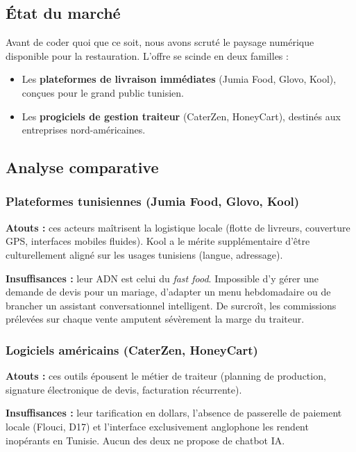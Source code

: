 \subsection{État du marché}

Avant de coder quoi que ce soit, nous avons scruté le paysage numérique disponible pour la restauration. L'offre se scinde en deux familles :
\begin{itemize}
    \item Les \textbf{plateformes de livraison immédiates} (Jumia Food, Glovo, Kool), conçues pour le grand public tunisien.
    \item Les \textbf{progiciels de gestion traiteur} (CaterZen, HoneyCart), destinés aux entreprises nord-américaines.
\end{itemize}

\subsection{Analyse comparative}

\subsubsection{Plateformes tunisiennes (Jumia Food, Glovo, Kool)}

\textbf{Atouts :} ces acteurs maîtrisent la logistique locale (flotte de livreurs, couverture GPS, interfaces mobiles fluides). Kool a le mérite supplémentaire d'être culturellement aligné sur les usages tunisiens (langue, adressage).

\textbf{Insuffisances :} leur ADN est celui du \textit{fast food}. Impossible d'y gérer une demande de devis pour un mariage, d'adapter un menu hebdomadaire ou de brancher un assistant conversationnel intelligent. De surcroît, les commissions prélevées sur chaque vente amputent sévèrement la marge du traiteur.

\subsubsection{Logiciels américains (CaterZen, HoneyCart)}

\textbf{Atouts :} ces outils épousent le métier de traiteur (planning de production, signature électronique de devis, facturation récurrente).

\textbf{Insuffisances :} leur tarification en dollars, l'absence de passerelle de paiement locale (Flouci, D17) et l'interface exclusivement anglophone les rendent inopérants en Tunisie. Aucun des deux ne propose de chatbot IA.

